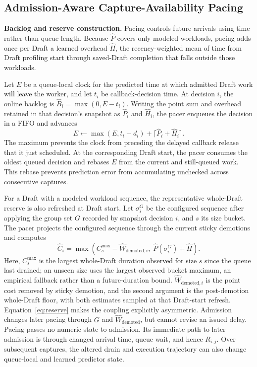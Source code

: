 \subsection{Admission-Aware Capture-Availability Pacing}
\label{sec:pacing}

\smallskip\noindent\textbf{Backlog and reserve construction.}
Pacing controls future arrivals using time rather than queue length.
Because \(\hat P\) covers only modeled workloads, pacing adds once per Draft a learned overhead \(\hat H\), the recency-weighted mean of time from Draft profiling start through saved-Draft completion that falls outside those workloads.

Let \(E\) be a queue-local clock for the predicted time at which admitted Draft work will leave the worker, and let \(t_i\) be callback-decision time.
At decision \(i\), the online backlog is \(\hat B_i=\max(0,E-t_i)\).
Writing the point sum and overhead retained in that decision's snapshot as \(\hat P_i\) and \(\hat H_i\), the pacer enqueues the decision in a FIFO and advances
\begin{equation}
  E \gets \max(E,t_i+d_i)+\lceil\hat P_i+\hat H_i\rceil .
  \label{eq:backlog-clock-update}
\end{equation}
The maximum prevents the clock from preceding the delayed callback release that it just scheduled.
At the corresponding Draft start, the pacer consumes the oldest queued decision and rebases \(E\) from the current and still-queued work.
This rebase prevents prediction error from accumulating unchecked across consecutive captures.

For a Draft with a modeled workload sequence, the representative whole-Draft reserve is also refreshed at Draft start.
Let \(\sigma_i^G\) be the configured sequence after applying the group set \(G\)
recorded by snapshot decision \(i\), and \(s\) its size bucket.
The pacer projects the configured sequence through the current sticky demotions and computes
\begin{equation}
  \hat C_i = \max\!\left(
    C^{\max}_s-\widehat W_{\mathrm{demoted},i},\;
    \hat P(\sigma_i^G)+\hat H
  \right).
  \label{eq:reserve}
\end{equation}
Here, \(C^{\max}_s\) is the largest whole-Draft duration observed for size \(s\) since the queue last drained; an unseen size uses the largest observed bucket maximum, an empirical fallback rather than a future-duration bound.
\(\widehat W_{\mathrm{demoted},i}\) is the point cost removed by sticky demotion, and the second argument is the post-demotion whole-Draft floor, with both estimates sampled at that Draft-start refresh.
Equation~\ref{eq:reserve} makes the coupling explicitly asymmetric.
Admission changes later pacing through \(G\) and \(\widehat W_{\mathrm{demoted}}\), but cannot revise an issued delay.
Pacing passes no numeric state to admission.
Its immediate path to later admission is through changed arrival time, queue wait, and hence \(R_{i,j}\).
Over subsequent captures, the altered drain and execution trajectory can also change queue-local and learned predictor state.

